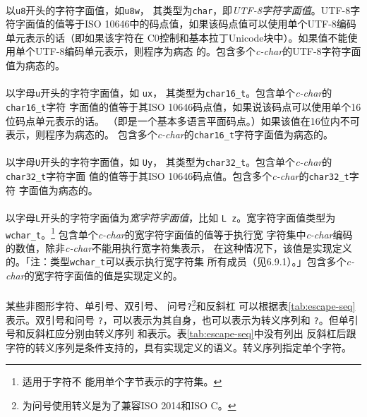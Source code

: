 \paragraph{}
以\texttt{u8}开头的字符字面值，如\texttt{u8\sq{}w\sq}，
其类型为\texttt{char}，即\textit{UTF-8字符字面值}。UTF-8字符字面值的值等于ISO
10646中的码点值，如果该码点值可以使用单个UTF-8编码单元表示的话（即如果该字符在
C0控制和基本拉丁Unicode块中）。如果值不能使用单个UTF-8编码单元表示，则程序为病态
的。包含多个\textit{c-char}的UTF-8字符字面值为病态的。

\paragraph{}
以字母\texttt{u}开头的字符字面值，如
\texttt{u\sq{}x\sq}，
其类型为\texttt{char16\_t}。包含单个\textit{c-char}的\texttt{char16\_t}字符
字面值的值等于其ISO 10646码点值，如果说该码点可以使用单个16位码点单元表示的话。
（即是一个基本多语言平面码点。）如果该值在16位内不可表示，则程序为病态的。
包含多个\textit{c-char}的\texttt{char16\_t}字符字面值为病态的。

\paragraph{}
以字母\texttt{U}开头的字符字面值，如
\texttt{U\sq{}y\sq}，
其类型为\texttt{char32\_t}。包含单个\textit{c-char}的\texttt{char32\_t}字符字面
值的值等于其ISO 10646码点值。包含多个\textit{c-char}的\texttt{char32\_t}字符
字面值为病态的。

\paragraph{}
以字母\texttt{L}开头的字符字面值为\textit{宽字符字面值}，比如
\texttt{L\sq
z\sq}。宽字符字面值类型为\texttt{wchar\_t}。\footnote{适用于字符不
能用单个字节表示的字符集。} 包含单个\textit{c-char}的宽字符字面值的值等于执行宽
字符集中\textit{c-char}编码的数值，除非\textit{c-char}不能用执行宽字符集表示，
在这种情况下，该值是实现定义的。「注：类型\texttt{wchar\_t}可以表示执行宽字符集
所有成员（见6.9.1）。」包含多个\textit{c-char}的宽字符字面值的值是实现定义的。

\paragraph{}
某些非图形字符、单引号\texttt{\sq}、双引号\texttt{\dq}、
问号\texttt{?}\footnote{为问号使用转义是为了兼容ISO 2014和ISO C。}和反斜杠
\texttt{\bs}可以根据表\ref{tab:escape-seq}表示。双引号\texttt{\dq}和问号
\texttt{?}，可以表示为其自身，也可以表示为转义序列\texttt{\bs\dq}和
\texttt{\bs ?}。但单引号\texttt{\sq}和反斜杠\texttt{\bs}应分别由转义序列
\texttt{\bs\sq}和\texttt{\bs\bs}表示。表\ref{tab:escape-seq}中没有列出
反斜杠后跟字符的转义序列是条件支持的，具有实现定义的语义。转义序列指定单个字符。

